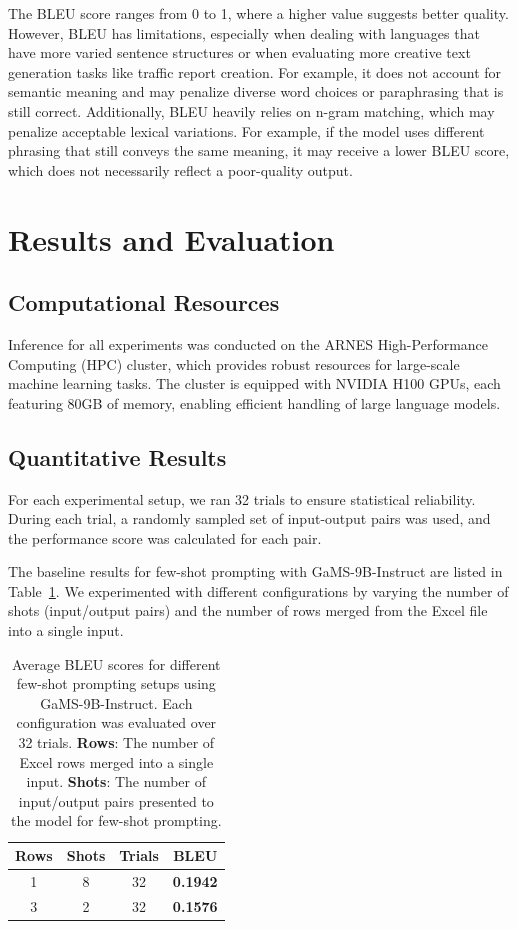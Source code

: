 \documentclass[fleqn,moreauthors,10pt]{ds_report}
\begin{document}
The BLEU score ranges from 0 to 1, where a higher value suggests better quality. However, BLEU has limitations, especially when dealing with languages that have more varied sentence structures or when evaluating more creative text generation tasks like traffic report creation. For example, it does not account for semantic meaning and may penalize diverse word choices or paraphrasing that is still correct. Additionally, BLEU heavily relies on n-gram matching, which may penalize acceptable lexical variations. For example, if the model uses different phrasing that still conveys the same meaning, it may receive a lower BLEU score, which does not necessarily reflect a poor-quality output.


\section{Results and Evaluation}

\subsection*{Computational Resources}

Inference for all experiments was conducted on the ARNES High-Performance Computing (HPC) cluster, which provides robust resources for large-scale machine learning tasks. The cluster is equipped with NVIDIA H100 GPUs, each featuring 80GB of memory, enabling efficient handling of large language models.

\subsection*{Quantitative Results}

For each experimental setup, we ran 32 trials to ensure statistical reliability. During each trial, a randomly sampled
set of input-output pairs was used, and the performance score was calculated for each pair.


The baseline results for few-shot prompting with GaMS-9B-Instruct \cite{huggingface2025gams9b} are listed in Table~\ref{tab:bleu-results}. We experimented with different configurations by varying the number of shots (input/output pairs) and the number of rows merged from the Excel file into a single input.
\begin{table}[h!]
    \centering
    \caption{Average BLEU scores for different few-shot prompting setups using GaMS-9B-Instruct. Each configuration was evaluated over 32 trials. \textbf{Rows}: The number of Excel rows merged into a single input. \textbf{Shots}: The number of input/output pairs presented to the model for few-shot prompting.}
    \label{tab:bleu-results}
    \small
    \begin{tabular}{@{}cccc@{}}
    \toprule
    \textbf{Rows} & \textbf{Shots} & \textbf{Trials} & \textbf{BLEU} \\
    \midrule
    1 & 8 & 32 & \textbf{0.1942} \\
    3 & 2 & 32 & \textbf{0.1576} \\
    \bottomrule
    \end{tabular}
\end{table}
\end{document}
